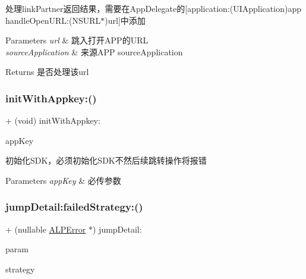 处理link\+Partner返回结果，需要在\+App\+Delegate的\mbox{[}application\+:(\+U\+I\+Application)app handle\+Open\+U\+R\+L\+:(\+N\+S\+U\+R\+L$\ast$)url\mbox{]}中添加


\begin{DoxyParams}{Parameters}
{\em url} & 跳入打开\+A\+P\+P的\+U\+RL \\
\hline
{\em source\+Application} & 来源\+A\+PP source\+Application\\
\hline
\end{DoxyParams}
\begin{DoxyReturn}{Returns}
是否处理该url 
\end{DoxyReturn}
\mbox{\label{interface_a_l_p_t_b_link_partner_s_d_k_ae0e3f4df25ea40bba08bc3588c39888d}} 
\subsubsection{\texorpdfstring{init\+With\+Appkey\+:()}{initWithAppkey:()}}
{\footnotesize\ttfamily + (void) init\+With\+Appkey\+: \begin{DoxyParamCaption}\item[{(nonnull N\+S\+String $\ast$)}]{app\+Key }\end{DoxyParamCaption}}

初始化\+S\+D\+K，必须初始化\+S\+D\+K不然后续跳转操作将报错


\begin{DoxyParams}{Parameters}
{\em app\+Key} & 必传参数 \\
\hline
\end{DoxyParams}
\mbox{\label{interface_a_l_p_t_b_link_partner_s_d_k_a91df05ce1cb2da4651b3d38f7bf3b6ec}} 
\subsubsection{\texorpdfstring{jump\+Detail\+:failed\+Strategy\+:()}{jumpDetail:failedStrategy:()}}
{\footnotesize\ttfamily + (nullable \mbox{\hyperlink{interface_a_l_p_error}{A\+L\+P\+Error}} $\ast$) jump\+Detail\+: \begin{DoxyParamCaption}\item[{(nonnull \mbox{\hyperlink{interface_a_l_p_t_b_detail_param}{A\+L\+P\+T\+B\+Detail\+Param}} $\ast$)}]{param }\item[{failedStrategy:(nullable \mbox{\hyperlink{interface_a_l_p_jump_failed_strategy}{A\+L\+P\+Jump\+Failed\+Strategy}} $\ast$)}]{strategy }\end{DoxyParamCaption}}

